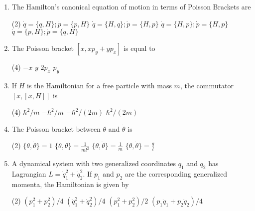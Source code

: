 \begin{enumerate}
\begin{tasks}
		\task[\textbf{b.}]Only the total energy is conserved
		\task[\textbf{c.}]The total energy and the $z$ - component of the total angular momentum are conserved
		\task[\textbf{d.}]  The total energy and total angular momentum are conserved
	\end{tasks}
	\item  The Hamilton's canonical equation of motion in terms of Poisson Brackets are
	{}
	\begin{tasks}(2)
		\task[\textbf{a.}]$\dot{q}=\{q, H\} ; \dot{p}=\{p, H\}$
		\task[\textbf{b.}]$\dot{q}=\{H, q\} ; \dot{p}=\{H, p\}$
		\task[\textbf{c.}]$\dot{q}=\{H, p\} ; \dot{p}=\{H, p\}$
		\task[\textbf{d.}] $\dot{q}=\{p, H\} ; \dot{p}=\{q, H\}$
	\end{tasks}
	\item  The Poisson bracket $\left[x, x p_{y}+y p_{x}\right]$ is equal to
	{}
	\begin{tasks}(4)
		\task[\textbf{a.}] $-x$
		\task[\textbf{b.}]$y$
		\task[\textbf{c.}]$2 p_{x}$
		\task[\textbf{d.}] $p_{y}$
	\end{tasks}
	\item  If $H$ is the Hamiltonian for a free particle with mass $m$, the commutator $[x,[x, H]]$ is
	{}
	\begin{tasks}(4)
		\task[\textbf{a.}]$\hbar^{2} / m$
		\task[\textbf{b.}]$-\hbar^{2} / m$
		\task[\textbf{c.}]$-\hbar^{2} /(2 m)$
		\task[\textbf{d.}] $\hbar^{2} /(2 m)$
	\end{tasks}
	\item  The Poisson bracket between $\theta$ and $\dot{\theta}$ is
	{}
	\begin{tasks}(2)
		\task[\textbf{a.}]$\{\theta, \dot{\theta}\}=1$
		\task[\textbf{b.}] $\{\theta, \dot{\theta}\}=\frac{1}{m l^{2}}$
		\task[\textbf{c.}]$\{\theta, \dot{\theta}\}=\frac{1}{m}$
		\task[\textbf{d.}] $\{\theta, \dot{\theta}\}=\frac{g}{l}$
	\end{tasks}
	\item  A dynamical system with two generalized coordinates $q_{1}$ and $q_{2}$ has Lagrangian $L=\dot{q}_{1}^{2}+\dot{q}_{2}^{2}$. If $p_{1}$ and $p_{2}$ are the corresponding generalized momenta, the Hamiltonian is given by
	{}
	\begin{tasks}(2)
		\task[\textbf{a.}]$\left(p_{1}^{2}+p_{2}^{2}\right) / 4$
		\task[\textbf{b.}] $\left(\dot{q}_{1}^{2}+\dot{q}_{2}^{2}\right) / 4$
		\task[\textbf{c.}] $\left(p_{1}^{2}+p_{2}^{2}\right) / 2$
		\task[\textbf{d.}]  $\left(p_{1} \dot{q}_{1}+p_{2} \dot{q}_{2}\right) / 4$

\end{tasks}
\end{enumerate}
